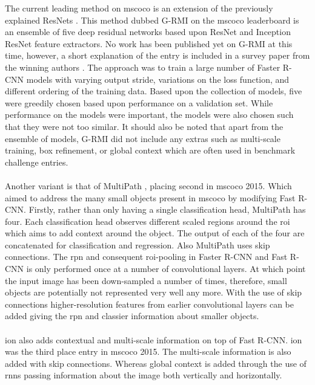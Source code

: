 The current leading method on \gls{mscoco} is an extension of the previously explained ResNets \cite{deepres}. This method dubbed G-RMI on the \gls{mscoco} leaderboard \cite{cocolead} is an ensemble of five deep residual networks based upon ResNet \cite{deepres} and Inception ResNet \cite{incepres} feature extractors. No work has been published yet on G-RMI at this time, however, a short explanation of the entry is included in a survey paper from the winning authors \cite{speedacc}. The approach was to train a large number of Faster R-CNN models with varying output stride, variations on the loss function, and different ordering of the training data. Based upon the collection of models, five were greedily chosen based upon performance on a validation set. While performance on the models were important, the models were also chosen such that they were not too similar. It should also be noted that apart from the ensemble of models, G-RMI did not include any extras such as multi-scale training, box refinement, or global context which are often used in benchmark challenge entries.
\\\\
Another variant is that of MultiPath \cite{multipath}, placing second in \gls{mscoco} 2015. Which aimed to address the many small objects present in \gls{mscoco} by modifying Fast R-CNN. Firstly, rather than only having a single classification head, MultiPath has four. Each classification head observes different scaled regions around the \gls{roi} which aims to add context around the object. The output of each of the four are concatenated for classification and regression. Also MultiPath uses skip connections. The \gls{rpn} and consequent \gls{roi}-pooling in Faster R-CNN and Fast R-CNN is only performed once at a number of convolutional layers. At which point the input image has been down-sampled a number of times, therefore, small objects are potentially not represented very well any more. With the use of skip connections higher-resolution features from earlier convolutional layers can be added giving the \gls{rpn} and classier information about smaller objects.
\\\\
\gls{ion} \cite{ion} also adds contextual and multi-scale information on top of Fast R-CNN. \gls{ion} was the third place entry in \gls{mscoco} 2015. The multi-scale information is also added with skip connections. Whereas global context is added through the use of \glspl{rnn} passing information about the image both vertically and horizontally.
\\\\

